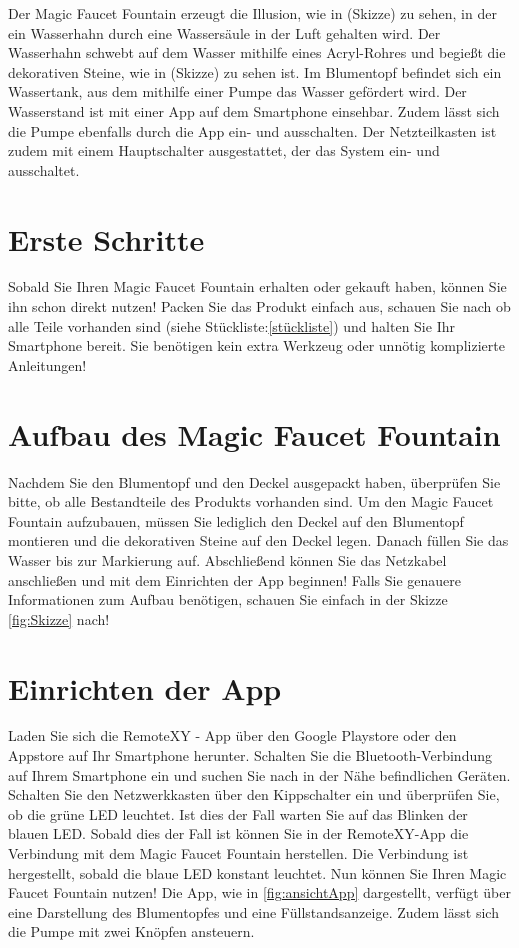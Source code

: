 Der Magic Faucet Fountain erzeugt die Illusion, wie in (Skizze) zu sehen, in der ein Wasserhahn durch eine Wassersäule in der Luft gehalten wird. Der Wasserhahn schwebt auf dem Wasser mithilfe eines Acryl-Rohres und begießt die dekorativen Steine, wie in (Skizze) zu sehen ist. Im Blumentopf befindet sich ein Wassertank, aus dem mithilfe einer Pumpe das Wasser gefördert wird. Der Wasserstand ist mit einer App auf dem Smartphone einsehbar. Zudem lässt sich die Pumpe ebenfalls durch die App ein- und ausschalten. Der Netzteilkasten ist zudem mit einem Hauptschalter ausgestattet, der das System ein- und ausschaltet. 

\section{Erste Schritte}
Sobald Sie Ihren Magic Faucet Fountain erhalten oder gekauft haben, können Sie ihn schon direkt nutzen! Packen Sie das Produkt einfach aus, schauen Sie nach ob alle Teile vorhanden sind (siehe Stückliste:\ref{stückliste}) und halten Sie Ihr Smartphone bereit. Sie benötigen kein extra Werkzeug oder unnötig komplizierte Anleitungen!

\section{Aufbau des Magic Faucet Fountain}
Nachdem Sie den Blumentopf und den Deckel ausgepackt haben, überprüfen Sie bitte, ob alle Bestandteile des Produkts vorhanden sind. Um den Magic Faucet Fountain aufzubauen, müssen Sie lediglich den Deckel auf den Blumentopf montieren und die dekorativen Steine auf den Deckel legen. Danach füllen Sie das Wasser bis zur Markierung auf. Abschließend können Sie das Netzkabel anschließen und mit dem Einrichten der App beginnen! Falls Sie genauere Informationen zum Aufbau benötigen, schauen Sie einfach in der Skizze \ref{fig:Skizze} nach!

\section{Einrichten der App}
Laden Sie sich die RemoteXY - App über den Google Playstore oder den Appstore auf Ihr Smartphone herunter. Schalten Sie die Bluetooth-Verbindung auf Ihrem Smartphone ein und suchen Sie nach in der Nähe befindlichen Geräten. Schalten Sie den Netzwerkkasten über den Kippschalter ein und überprüfen Sie, ob die grüne LED leuchtet. Ist dies der Fall warten Sie auf das Blinken der blauen LED. Sobald dies der Fall ist können Sie in der RemoteXY-App die Verbindung mit dem Magic Faucet Fountain herstellen. Die Verbindung ist hergestellt, sobald die blaue LED konstant leuchtet. Nun können Sie Ihren Magic Faucet Fountain nutzen!
Die App, wie in \ref{fig:ansichtApp} dargestellt, verfügt über eine Darstellung des Blumentopfes und eine Füllstandsanzeige. Zudem lässt sich die Pumpe mit zwei Knöpfen ansteuern.


